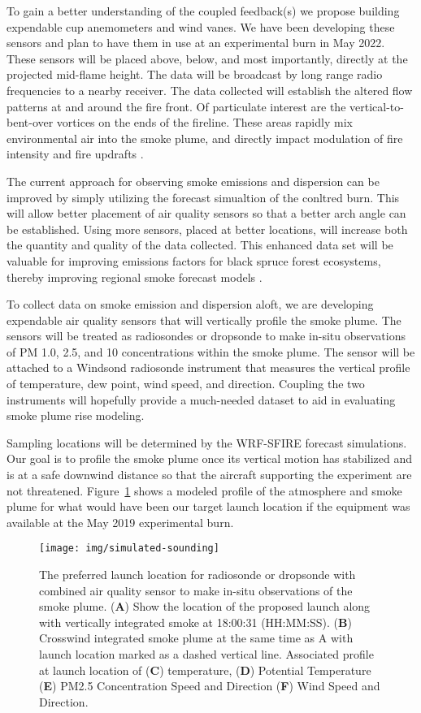 \documentclass[preprints,article,accept,moreauthors,pdftex]{Definitions/mdpi}
\begin{document}
To gain a better understanding of the coupled feedback(s) we propose building expendable cup anemometers and wind vanes. We have been developing these sensors and plan to have them in use at an experimental burn in May 2022. These sensors will be placed above, below, and most importantly, directly at the projected mid-flame height. The data will be broadcast by long range radio frequencies to a nearby receiver. The data collected will establish the altered flow patterns at and around the fire front. Of particulate interest are the vertical-to-bent-over vortices on the ends of the fireline. These areas rapidly mix environmental air into the smoke plume, and directly impact modulation of fire intensity and fire updrafts \cite{moisseeva_capturing_2019,moisseeva_wildfire_2021,clements_fire_2016}.

The current approach for observing smoke emissions and dispersion can be improved by simply utilizing the forecast simualtion of the conltred burn. This will allow better placement of air quality sensors so that a better arch angle can be established. Using more sensors, placed at better locations, will increase both the quantity and quality of the data collected. This enhanced data set will be valuable for improving emissions factors for black spruce forest ecosystems, thereby improving regional smoke forecast models \cite{prichard_wildland_2020}.

To collect data on smoke emission and dispersion aloft, we are developing expendable air quality sensors that will vertically profile the smoke plume. The sensors will be treated as radiosondes or dropsonde to make in-situ observations of PM 1.0, 2.5, and 10 concentrations within the smoke plume. The sensor will be attached to a Windsond radiosonde instrument \cite{bessardon_evaluation_2019} that measures the vertical profile of temperature, dew point, wind speed, and direction. Coupling the two instruments will hopefully provide a much-needed dataset to aid in evaluating smoke plume rise modeling.

Sampling locations will be determined by the WRF-SFIRE forecast simulations. Our goal is to profile the smoke plume once its vertical motion has stabilized and is at a safe downwind distance so that the aircraft supporting the experiment are not threatened. Figure~\ref{fig8} shows a modeled profile of the atmosphere and smoke plume for what would have been our target launch location if the equipment was available at the May 2019 experimental burn.

\begin{figure}[H]
\centering
 \texttt{[image: img/simulated-sounding]}
 \caption{The preferred launch location for radiosonde or dropsonde with combined air quality sensor to make in-situ observations of the smoke plume. (\textbf{A}) Show the location of the proposed launch along with vertically integrated smoke at 18:00:31 (HH:MM:SS). (\textbf{B}) Crosswind integrated smoke plume at the same time as A with launch location marked as a dashed vertical line. Associated profile at launch location of (\textbf{C}) temperature, (\textbf{D}) Potential Temperature (\textbf{E}) PM2.5 Concentration Speed and Direction (\textbf{F}) Wind Speed and Direction. \label{fig8}}
 \end{figure}
\end{document}
